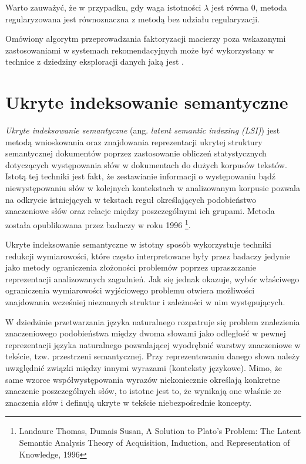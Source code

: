 \documentclass{pracamgr}
\begin{document}
Warto zauważyć, że w przypadku, gdy waga istotności $\lambda$ jest równa 0, metoda regularyzowana jest równoznaczna z metodą bez udziału regularyzacji.

Omówiony algorytm przeprowadzania faktoryzacji macierzy poza wskazanymi zastosowaniami w systemach rekomendacyjnych może być wykorzystany w technice z dziedziny eksploracji danych jaką jest .

\section{Ukryte indeksowanie semantyczne}
\textit{Ukryte indeksowanie semantyczne} (ang. \textit{latent semantic indexing (LSI)}) jest metodą wnioskowania oraz znajdowania reprezentacji ukrytej struktury semantycznej dokumentów poprzez zastosowanie obliczeń statystycznych dotyczących występowania słów w dokumentach do dużych korpusów tekstów. Istotą tej techniki jest fakt, że zestawianie informacji o występowaniu bądź niewystępowaniu słów w kolejnych kontekstach w analizowanym korpusie pozwala na odkrycie istniejących w tekstach reguł określających podobieństwo znaczeniowe słów oraz relacje między poszczególnymi ich grupami. Metoda została opublikowana przez badaczy w roku 1996 \footnote{Landaure Thomas, Dumais Susan, A Solution to Plato's Problem: The Latent Semantic Analysis Theory
of Acquisition, Induction, and Representation of Knowledge, 1996}. 

Ukryte indeksowanie semantyczne w istotny sposób wykorzystuje techniki redukcji wymiarowości, które często interpretowane były przez badaczy jedynie jako metody ograniczenia złożoności problemów poprzez upraszczanie reprezentacji analizowanych zagadnień. Jak się jednak okazuje, wybór właściwego ograniczenia wymiarowości wyjściowego problemu otwiera możliwości znajdowania wcześniej nieznanych struktur i zależności w nim występujących. 

W dziedzinie przetwarzania języka naturalnego rozpatruje się problem znalezienia znaczeniowego podobieństwa między dwoma słowami jako odległość w pewnej reprezentacji języka naturalnego pozwalającej wyodrębnić warstwy znaczeniowe w tekście, tzw. przestrzeni semantycznej. Przy reprezentowaniu danego słowa należy uwzględnić związki między innymi wyrazami (konteksty językowe). Mimo, że same wzorce współwystępowania wyrazów niekoniecznie określają konkretne znaczenie poszczególnych słów, to istotne jest to, że wynikają one właśnie ze znaczenia słów i definują ukryte w tekście niebezpośrednie koncepty.
\end{document}
